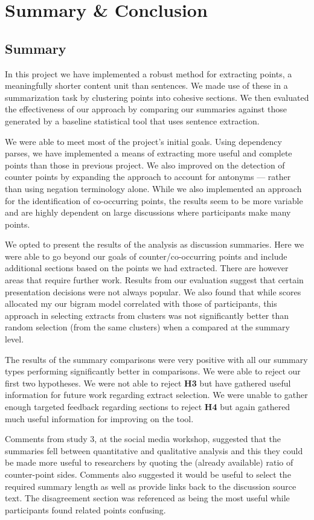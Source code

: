\chapter{Summary \& Conclusion \label{chap:conclusion}}
  \section{Summary}
    In this project we have implemented a robust method for extracting points, a meaningfully shorter content unit than sentences. We made use of these in a summarization task by clustering points into cohesive sections. We then evaluated the effectiveness of our approach by comparing our summaries against those generated by a baseline statistical tool that uses sentence extraction.

    We were able to meet most of the project's initial goals. Using dependency parses, we have implemented a means of extracting more useful and complete points than those in previous project. We also improved on the detection of counter points by expanding the approach to account for antonyms --- rather than using negation terminology alone. While we also implemented an approach for the identification of co-occurring points, the results seem to be more variable and are highly dependent on large discussions where participants make many points.

    We opted to present the results of the analysis as discussion summaries. Here we were able to go beyond our goals of counter/co-occurring points and include additional sections based on the points we had extracted. There are however areas that require further work. Results from our evaluation suggest that certain presentation decisions were not always popular. We also found that while scores allocated my our bigram model correlated with those of participants, this approach in selecting extracts from clusters was not significantly better than random selection (from the same clusters) when a compared at the summary level.

    The results of the summary comparisons were very positive with all our summary types performing significantly better in comparisons. We were able to reject our first two hypotheses. We were not able to reject \textbf{H3} but have gathered useful information for future work regarding extract selection. We were unable to gather enough targeted feedback regarding sections to reject \textbf{H4} but again gathered much useful information for improving on the tool.

    Comments from study 3, at the social media workshop, suggested that the summaries fell between quantitative and qualitative analysis and this they could be made more useful to researchers by quoting the (already available) ratio of counter-point sides. Comments also suggested it would be useful to select the required summary length as well as provide links back to the discussion source text. The disagreement section was referenced as being the most useful while participants found related points confusing.

